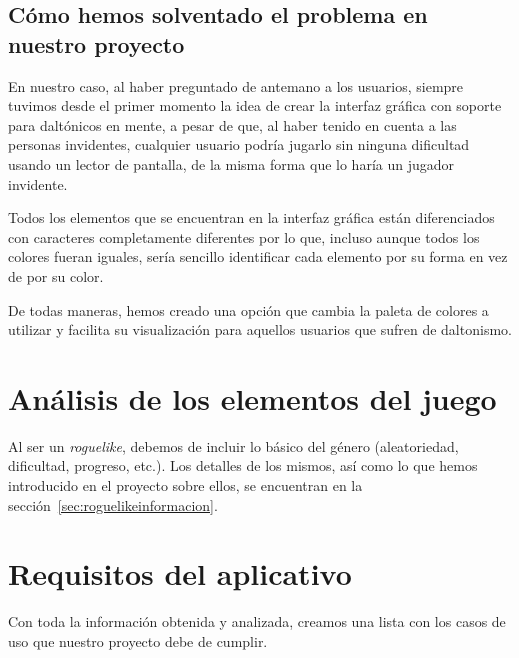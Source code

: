 \subsection{Cómo hemos solventado el problema en nuestro proyecto}
\label{sec:solventadodaltonicos}

En nuestro caso, al haber preguntado de antemano a los usuarios, siempre tuvimos desde el primer momento la idea de crear la interfaz gráfica con soporte para daltónicos en mente, a pesar de que, al haber tenido en cuenta a las personas invidentes, cualquier usuario podría jugarlo sin ninguna dificultad usando un lector de pantalla, de la misma forma que lo haría un jugador invidente.

Todos los elementos que se encuentran en la interfaz gráfica están diferenciados con caracteres completamente diferentes por lo que, incluso aunque todos los colores fueran iguales, sería sencillo identificar cada elemento por su forma en vez de por su color. 

De todas maneras, hemos creado una opción que cambia la paleta de colores a utilizar y facilita su visualización para aquellos usuarios que sufren de daltonismo.

\section{Análisis de los elementos del juego}
Al ser un \textit{roguelike}, debemos de incluir lo básico del género (aleatoriedad, dificultad, progreso, etc.). Los detalles de los mismos, así como lo que hemos introducido en el proyecto sobre ellos, se encuentran en la sección~\ref{sec:roguelikeinformacion}.

\section{Requisitos del aplicativo}
Con toda la información obtenida y analizada, creamos una lista con los casos de uso que nuestro proyecto debe de cumplir.

